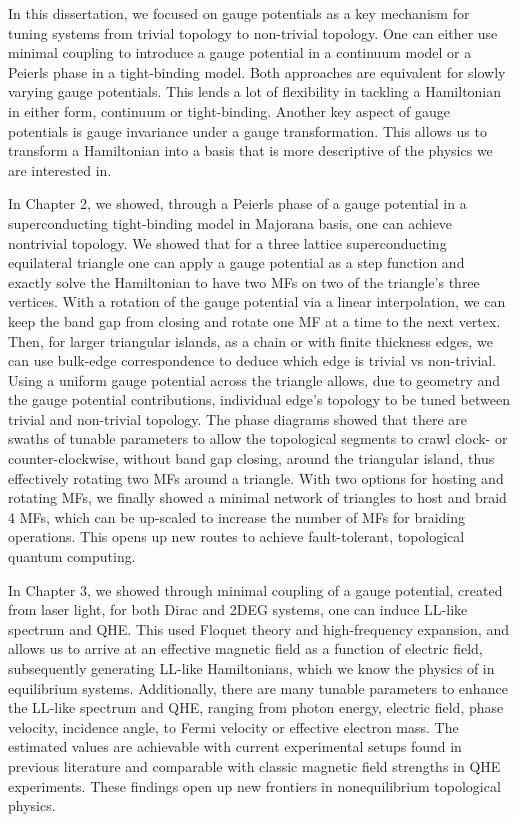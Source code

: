 In this dissertation, we focused on gauge potentials as a key mechanism for tuning systems from trivial topology to non-trivial topology.
One can either use minimal coupling to introduce a gauge potential in a continuum model or a Peierls phase in a tight-binding model.
Both approaches are equivalent for slowly varying gauge potentials.
This lends a lot of flexibility in tackling a Hamiltonian in either form, continuum or tight-binding.
Another key aspect of gauge potentials is gauge invariance under a gauge transformation.
This allows us to transform a Hamiltonian into a basis that is more descriptive of the physics we are interested in.

In Chapter 2, we showed, through a Peierls phase of a gauge potential in a superconducting tight-binding model in Majorana basis, one can achieve nontrivial topology.
We showed that for a three lattice superconducting equilateral triangle one can apply a gauge potential as a step function and exactly solve the Hamiltonian to have two MFs on two of the triangle's three vertices.
With a rotation of the gauge potential via a linear interpolation, we can keep the band gap from closing and rotate one MF at a time to the next vertex.
Then, for larger triangular islands, as a chain or with finite thickness edges, we can use bulk-edge correspondence to deduce which edge is trivial vs non-trivial.
Using a uniform gauge potential across the triangle allows, due to geometry and the gauge potential contributions, individual edge's topology to be tuned between trivial and non-trivial topology.
The phase diagrams showed that there are swaths of tunable parameters to allow the topological segments to crawl clock- or counter-clockwise, without band gap closing, around the triangular island, thus effectively rotating two MFs around a triangle.
With two options for hosting and rotating MFs, we finally showed a minimal network of triangles to host and braid 4 MFs, which can be up-scaled to increase the number of MFs for braiding operations.
This opens up new routes to achieve fault-tolerant, topological quantum computing.

In Chapter 3, we showed through minimal coupling of a gauge potential, created from laser light, for both Dirac and 2DEG systems, one can induce LL-like spectrum and QHE.
This used Floquet theory and high-frequency expansion, and allows us to arrive at an effective magnetic field as a function of electric field, subsequently generating LL-like Hamiltonians, which we know the physics of in equilibrium systems.
Additionally, there are many tunable parameters to enhance the LL-like spectrum and QHE, ranging from photon energy, electric field, phase velocity, incidence angle, to Fermi velocity or effective electron mass.
The estimated values are achievable with current experimental setups found in previous literature and comparable with classic magnetic field strengths in QHE experiments.
These findings open up new frontiers in nonequilibrium topological physics.

